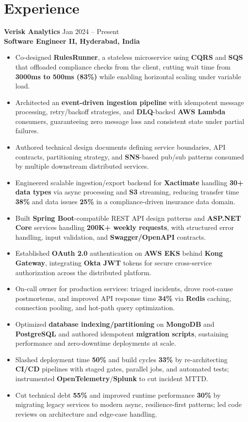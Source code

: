 \documentclass[a4paper,10pt]{article}
\begin{document}
\section*{Experience}

\textbf{Verisk Analytics} \hfill Jan 2024 -- Present \\
\textbf{Software Engineer II, Hyderabad, India}

\begin{itemize}[leftmargin=*]
    \item Co-designed \textbf{RulesRunner}, a stateless microservice using \textbf{CQRS} and \textbf{SQS} that offloaded compliance checks from the client, cutting wait time from \textbf{3000ms to 500ms (83\%)} while enabling horizontal scaling under variable load.
    \item Architected an \textbf{event-driven ingestion pipeline} with idempotent message processing, retry/backoff strategies, and \textbf{DLQ}-backed \textbf{AWS Lambda} consumers, guaranteeing zero message loss and consistent state under partial failures.
    \item Authored technical design documents defining service boundaries, API contracts, partitioning strategy, and \textbf{SNS}-based pub/sub patterns consumed by multiple downstream distributed services.
    \item Engineered scalable ingestion/export backend for \textbf{Xactimate} handling \textbf{30+ data types} via async processing and \textbf{S3} streaming, reducing transfer time \textbf{38\%} and data issues \textbf{25\%} in a compliance-driven insurance data domain.
    \item Built \textbf{Spring Boot}-compatible REST API design patterns and \textbf{ASP.NET Core} services handling \textbf{200K+ weekly requests}, with structured error handling, input validation, and \textbf{Swagger/OpenAPI} contracts.
    \item Established \textbf{OAuth 2.0} authentication on \textbf{AWS EKS} behind \textbf{Kong Gateway}, integrating \textbf{Okta JWT} tokens for secure cross-service authorization across the distributed platform.
    \item On-call owner for production services: triaged incidents, drove root-cause postmortems, and improved API response time \textbf{34\%} via \textbf{Redis} caching, connection pooling, and hot-path query optimization.
    \item Optimized \textbf{database indexing/partitioning} on \textbf{MongoDB} and \textbf{PostgreSQL} and authored idempotent \textbf{migration scripts}, sustaining performance and zero-downtime deployments at scale.
    \item Slashed deployment time \textbf{50\%} and build cycles \textbf{33\%} by re-architecting \textbf{CI/CD} pipelines with staged gates, parallel jobs, and automated tests; instrumented \textbf{OpenTelemetry}/\textbf{Splunk} to cut incident MTTD.
    \item Cut technical debt \textbf{55\%} and improved runtime performance \textbf{30\%} by migrating legacy services to modern async, resilience-first patterns; led code reviews on architecture and edge-case handling.
\end{itemize}
\end{document}
